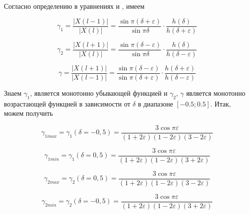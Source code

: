 Согласно определению в уравнениях  и , имеем

\begin{equation}
\label{eq:equation62}
\gamma_1 = \frac{\left| X(l-1)\right|}{\left| X(l)\right|} = \frac{\sin \pi({\delta + \varepsilon})}{\sin \pi \delta} \cdot \frac{h(\delta)}{h(\delta + \varepsilon)}
\end{equation}

\begin{equation}
\label{eq:equation63}
\gamma_2 = \frac{\left| X(l+1)\right|}{\left| X(l)\right|} = \frac{\sin \pi({\delta - \varepsilon})}{\sin \pi \delta} \cdot \frac{h(\delta)}{h(\delta - \varepsilon)}
\end{equation}

\begin{equation}
\label{eq:equation64}
\gamma = \frac{\left| X(l+1)\right|}{\left| X(l-1)\right|} = \frac{\sin \pi({\delta - \varepsilon})}{\sin \pi ({\delta + \varepsilon})} \cdot \frac{h({\delta + \varepsilon})}{h(\delta - \varepsilon)}
\end{equation}

Знаем $\gamma_1$, является монотонно убывающей функцией и $\gamma_2$, $\gamma$ является монотонно возрастающей функцией в зависимости от $\delta$ в диапазоне $[-0.5;0.5]$. Итак, можем получить

\begin{equation}
\label{eq:equation65}
\gamma_{1 max} = \gamma_1 (\delta = - 0,5) = \frac{3 \cos \pi \varepsilon}{(1 + 2 \varepsilon)(1 - 2 \varepsilon)(3 - 2 \varepsilon)}
\end{equation}

\begin{equation}
\label{eq:equation66}
\gamma_{1 min} = \gamma_1 (\delta = 0,5) = \frac{3 \cos \pi \varepsilon}{(1 + 2 \varepsilon)(1 - 2 \varepsilon)(3 + 2 \varepsilon)}
\end{equation}

\begin{equation}
\label{eq:equation67}
\gamma_{2 max} = \gamma_2 (\delta = 0,5) = \frac{3 \cos \pi \varepsilon}{(1 + 2 \varepsilon)(1 - 2 \varepsilon)(3 - 2 \varepsilon)}
\end{equation}

\begin{equation}
\label{eq:equation68}
\gamma_{2 min} = \gamma_2 (\delta = -0,5) = \frac{3 \cos \pi \varepsilon}{(1 + 2 \varepsilon)(1 - 2 \varepsilon)(3 + 2 \varepsilon)}
\end{equation}

